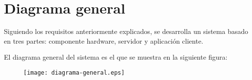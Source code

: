 \section{Diagrama general}

Siguiendo los requisitos anteriormente explicados, se desarrolla un sistema basado en tres partes: componente hardware, servidor y aplicación cliente.

El diagrama general del sistema es el que se muestra en la siguiente figura:

\begin{figure}[h!]
    \centering
    \texttt{[image: diagrama-general.eps]}
    \label{fig:diagrama-general}
\end{figure}